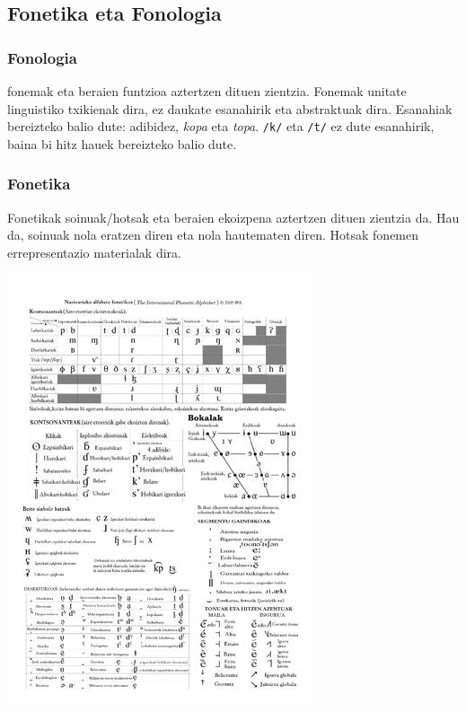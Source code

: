 \documentclass[
]{book}
\begin{document}
\hypertarget{fonetika-eta-fonologia}{%
\subsection{Fonetika eta Fonologia}\label{fonetika-eta-fonologia}}

\hypertarget{fonologia}{%
\subsubsection{Fonologia}\label{fonologia}}

fonemak eta beraien funtzioa aztertzen dituen zientzia. Fonemak unitate linguistiko txikienak dira, ez daukate esanahirik eta abstraktuak dira.
Esanahiak bereizteko balio dute: adibidez, \emph{kopa} eta \emph{topa}. \texttt{/k/} eta \texttt{/t/} ez dute esanahirik, baina bi hitz hauek bereizteko balio dute.

\hypertarget{fonetika}{%
\subsubsection{Fonetika}\label{fonetika}}

Fonetikak soinuak/hotsak eta beraien ekoizpena aztertzen dituen zientzia da. Hau da, soinuak nola eratzen diren eta nola hautematen diren.
Hotsak fonemen errepresentazio materialak dira.

\href{https://upload.wikimedia.org/wikipedia/commons/9/92/International_Phonetic_Alphabet_translated_into_basque_Nazioarteko_alfabeto_fonetikoa_eu.pdf}{\includegraphics{assets/img/IPA(tx)_eu.pdf.jpg}}
\end{document}
